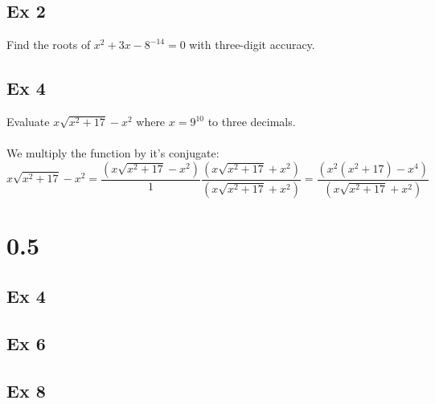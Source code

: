 \documentclass[12pt,letterpaper]{article}
\begin{document}

\subsection*{Ex 2}
Find the roots of $x^2  + 3x - 8^{-14} = 0$ with three-digit accuracy.



\subsection*{Ex 4}
Evaluate $x\sqrt{x^2 + 17} - x^2$ where $x = 9^{10}$  to three decimals.

\paragraph*{}We multiply the function by it's conjugate:
\begin{equation}
x\sqrt{x^2 + 17} - x^2 = 
\frac{(x\sqrt{x^2 + 17} - x^2)}{1}\frac{(x\sqrt{x^2 + 17} + x^2)}{(x\sqrt{x^2 + 17} + x^2)} =
\frac{(x^2(x^2 + 17) - x^4)}{(x\sqrt{x^2 + 17} + x^2)}
\end{equation}


\section*{0.5}


\subsection*{Ex 4}


\subsection*{Ex 6}


\subsection*{Ex 8}

\end{document}
